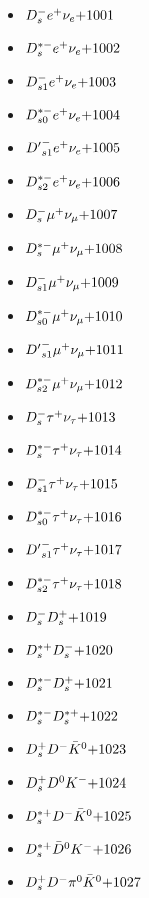 
 \begin{multicols}{3} 
 \begin{itemize}
 \item $ D_{s}^{-} e^{+} \nu_{e} \hfill{+1001}$
 \item $ D_{s}^{*-} e^{+} \nu_{e} \hfill{+1002}$
 \item $ D_{s1}^{-} e^{+} \nu_{e} \hfill{+1003}$
 \item $ D_{s0}^{*-} e^{+} \nu_{e} \hfill{+1004}$
 \item $ {D^{\prime}}_{s1}^{-} e^{+} \nu_{e} \hfill{+1005}$
 \item $ D_{s2}^{*-} e^{+} \nu_{e} \hfill{+1006}$
 \item $ D_{s}^{-} \mu^{+} \nu_{\mu} \hfill{+1007}$
 \item $ D_{s}^{*-} \mu^{+} \nu_{\mu} \hfill{+1008}$
 \item $ D_{s1}^{-} \mu^{+} \nu_{\mu} \hfill{+1009}$
 \item $ D_{s0}^{*-} \mu^{+} \nu_{\mu} \hfill{+1010}$
 \item $ {D^{\prime}}_{s1}^{-} \mu^{+} \nu_{\mu} \hfill{+1011}$
 \item $ D_{s2}^{*-} \mu^{+} \nu_{\mu} \hfill{+1012}$
 \item $ D_{s}^{-} \tau^{+} \nu_{\tau} \hfill{+1013}$
 \item $ D_{s}^{*-} \tau^{+} \nu_{\tau} \hfill{+1014}$
 \item $ D_{s1}^{-} \tau^{+} \nu_{\tau} \hfill{+1015}$
 \item $ D_{s0}^{*-} \tau^{+} \nu_{\tau} \hfill{+1016}$
 \item $ {D^{\prime}}_{s1}^{-} \tau^{+} \nu_{\tau} \hfill{+1017}$
 \item $ D_{s2}^{*-} \tau^{+} \nu_{\tau} \hfill{+1018}$
 \item $ D_{s}^{-} D_{s}^{+} \hfill{+1019}$
 \item $ D_{s}^{*+} D_{s}^{-} \hfill{+1020}$
 \item $ D_{s}^{*-} D_{s}^{+} \hfill{+1021}$
 \item $ D_{s}^{*-} D_{s}^{*+} \hfill{+1022}$
 \item $ D_{s}^{+} D^{-} \bar{K}^{0} \hfill{+1023}$
 \item $ D_{s}^{+} D^{0} K^{-} \hfill{+1024}$
 \item $ D_{s}^{*+} D^{-} \bar{K}^{0} \hfill{+1025}$
 \item $ D_{s}^{*+} \bar{D}^{0} K^{-} \hfill{+1026}$
 \item $ D_{s}^{+} D^{-} \pi^{0} \bar{K}^{0} \hfill{+1027}$

\end{itemize}
\end{multicols}
